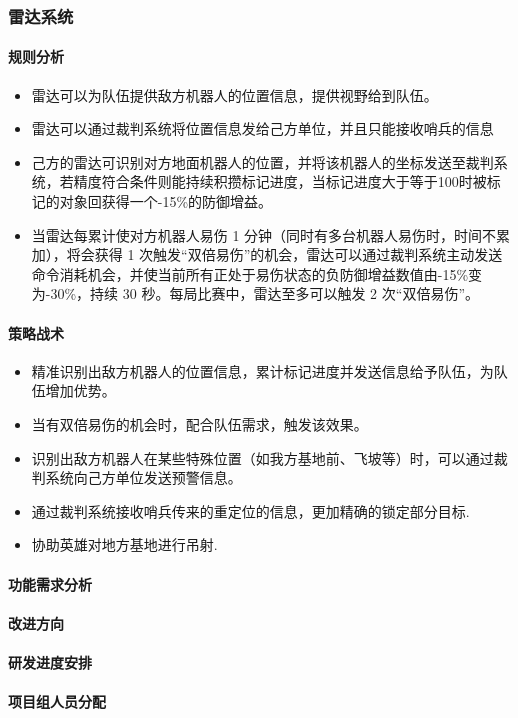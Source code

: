 

\subsubsection{雷达系统}

    \paragraph{规则分析}


    \begin{itemize}
        \item 雷达可以为队伍提供敌方机器人的位置信息，提供视野给到队伍。
        \item 雷达可以通过裁判系统将位置信息发给己方单位，并且只能接收哨兵的信息
        \item 己方的雷达可识别对方地面机器人的位置，并将该机器人的坐标发送至裁判系统，若精度符合条件则能持续积攒标记进度，当标记进度大于等于100时被标记的对象回获得一个-15\%的防御增益。
        \item 当雷达每累计使对方机器人易伤 1 分钟（同时有多台机器人易伤时，时间不累加），将会获得 1 次触发“双倍易伤”的机会，雷达可以通过裁判系统主动发送命令消耗机会，并使当前所有正处于易伤状态的负防御增益数值由-15\%变为-30\%，持续 30 秒。每局比赛中，雷达至多可以触发 2 次“双倍易伤”。
    \end{itemize}

    \paragraph{策略战术}


    \begin{itemize}
        \item 精准识别出敌方机器人的位置信息，累计标记进度并发送信息给予队伍，为队伍增加优势。
        \item 当有双倍易伤的机会时，配合队伍需求，触发该效果。
        \item 识别出敌方机器人在某些特殊位置（如我方基地前、飞坡等）时，可以通过裁判系统向己方单位发送预警信息。
        \item 通过裁判系统接收哨兵传来的重定位的信息，更加精确的锁定部分目标.
        \item 协助英雄对地方基地进行吊射.
    \end{itemize}
    
    \paragraph{功能需求分析}

    
    
    \paragraph{改进方向}

    \paragraph{研发进度安排}

    \paragraph{项目组人员分配}
    